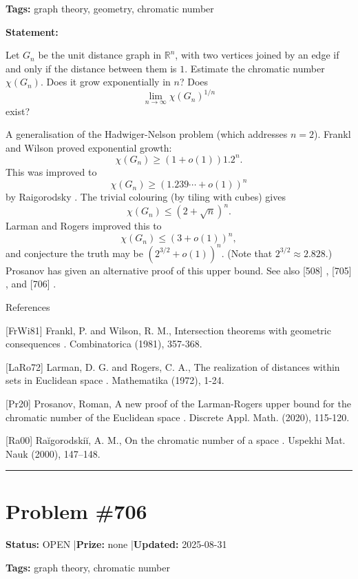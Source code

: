 \documentclass{article}
\begin{document}
\noindent\textbf{Tags:} graph theory, geometry, chromatic number

\medskip

\noindent\textbf{Statement:}

Let $G_n$ be the unit distance graph in $\mathbb{R}^n$, with two vertices joined by an edge if and only if the distance between them is $1$. Estimate the chromatic number $\chi(G_n)$. Does it grow exponentially in $n$? Does\[\lim_{n\to \infty}\chi(G_n)^{1/n}\]exist?




A generalisation of the Hadwiger-Nelson problem (which addresses $n=2$). Frankl and Wilson \cite{FrWi81} proved exponential growth:\[\chi(G_n) \geq (1+o(1))1.2^n.\]This was improved to\[\chi(G_n)\geq (1.239\cdots+o(1))^n\]by Raigorodsky \cite{Ra00}. The trivial colouring (by tiling with cubes) gives\[\chi(G_n) \leq (2+\sqrt{n})^n.\]Larman and Rogers \cite{LaRo72} improved this to\[\chi(G_n) \leq (3+o(1))^n,\]and conjecture the truth may be $(2^{3/2}+o(1))^n$. (Note that $2^{3/2}\approx 2.828$.) Prosanov \cite{Pr20} has given an alternative proof of this upper bound. See also [508] , [705] , and [706] .




References

[FrWi81] Frankl, P. and Wilson, R. M., Intersection theorems with geometric consequences . Combinatorica (1981), 357-368.

[LaRo72] Larman, D. G. and Rogers, C. A., The realization of distances within sets in Euclidean space . Mathematika (1972), 1-24.

[Pr20] Prosanov, Roman, A new proof of the Larman-Rogers upper bound for the chromatic number of the Euclidean space . Discrete Appl. Math. (2020), 115-120.

[Ra00] Ra\u igorodski\u i, A. M., On the chromatic number of a space . Uspekhi Mat. Nauk (2000), 147--148.

\noindent\rule{\linewidth}{0.4pt}


\section{Problem \#706}
\label{prob:706}

\noindent\textbf{Status:} OPEN \quad|\quad \textbf{Prize:} none \quad|\quad \textbf{Updated:} 2025-08-31

\noindent\textbf{Tags:} graph theory, chromatic number
\end{document}
